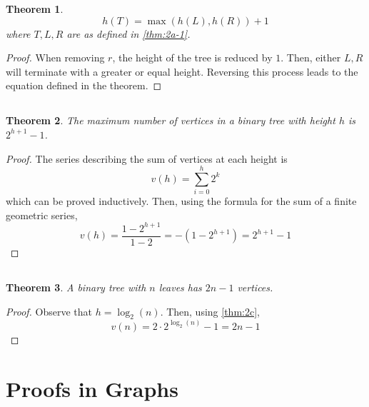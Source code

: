 \documentclass{article}
\newtheorem{theorem}{Theorem}
\begin{document}
\begin{theorem}
    \begin{equation}
        h(T) = \max(h(L), h(R)) + 1
    \end{equation}
    where \(T, L, R\) are as defined in \autoref{thm:2a-1}.
\end{theorem}
\begin{proof}
    When removing \(r\), the height of the tree is reduced by \(1\).
    Then, either \(L, R\) will terminate with a greater or equal height.
    Reversing this process leads to the equation defined in the theorem.
\end{proof}

\subsection{}

\begin{theorem} \label{thm:2c}
    The maximum number of vertices in a binary tree with height \(h\) is \(2^{h + 1} - 1\).
\end{theorem}
\begin{proof}
    The series describing the sum of vertices at each height is
    \begin{equation}
        v(h) = \sum_{i = 0}^h 2^k
    \end{equation}
    which can be proved inductively.
    Then, using the formula for the sum of a finite geometric series,
    \begin{equation}
        v(h) = \frac{1 - 2^{h + 1}}{1 - 2} = -(1 - 2^{h + 1}) = 2^{h + 1} - 1
    \end{equation}
\end{proof}

\subsection{}

\begin{theorem}
    A binary tree with \(n\) leaves has \(2n - 1\) vertices.
\end{theorem}
\begin{proof}
    Observe that \(h = \log_2(n)\).
    Then, using \autoref{thm:2c},
    \begin{equation}
        v(n) = 2 \cdot 2^{\log_2(n)} - 1 = 2n - 1
    \end{equation}
\end{proof}

\section{Proofs in Graphs}
\end{document}
